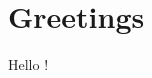 \documentclass{article}
\begin{document}
    \tableofcontents
    \section{Greetings}
    Hello !
\end{document}
